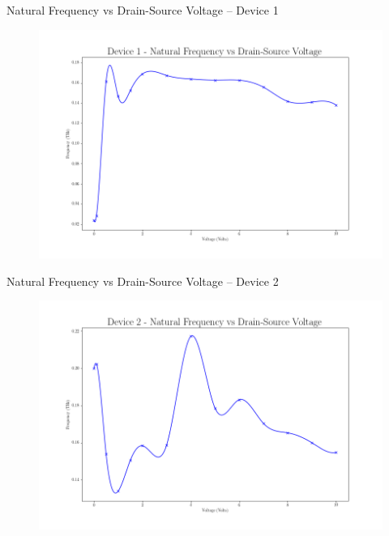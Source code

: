 \documentclass{beamer}
\begin{document}
\begin{frame}{Natural Frequency vs Drain-Source Voltage -- Device 1}
    \begin{figure}
        \centering
        \includegraphics[scale=0.35]{Figures/Device_1/NaturalFrequency.png}
        \label{fig:nfreq_1}
    \end{figure}
\end{frame}

\begin{frame}{Natural Frequency vs Drain-Source Voltage -- Device 2}
    \begin{figure}
        \centering
        \includegraphics[scale=0.35]{Figures/Device_2/NaturalFrequency.png}
        \label{fig:nfreq_2}
    \end{figure}
\end{frame}
\end{document}
